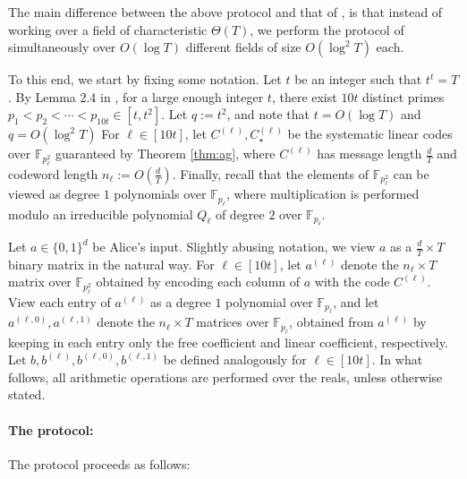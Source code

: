 \documentclass[11pt]{article}
\theoremstyle{plain}
\theoremstyle{remark}
\newcommand{\F}{\mathbb{F}}
\begin{document}
The main difference between the above protocol and that of \cite{CW19}, is that instead of working over a field of characteristic $\Theta(T)$, we perform the protocol of \cite{CW19} simultaneously over $O(\log T)$ different fields of size $O(\log^2T)$ each.

To this end, we start by fixing some notation.
Let $t$ be an integer such that $t^t=T$. By Lemma 2.4 in \cite{Che18}, for a large enough integer $t$, there exist $10 t$ distinct primes $p_{1} < p_2<\cdots < p_{10 t} \in [t,t^2]$.
Let $q:=t^2$, and note that $t = O(\log T)$ and $q = O(\log^2T)$
 For $\ell \in [10 t]$, let  $C^{(\ell)}, C_\star^{(\ell)}$  be the systematic linear codes over $\F_{p_\ell^2}$ guaranteed by Theorem \ref{thm:ag}, where $C^{(\ell)}$ has message length $\frac d T$ and codeword length $n_\ell:=O(\frac d T)$. 
 Finally, recall that the elements of $\F_{p_\ell^2}$ can be viewed as degree $1$ polynomials over $\F_{p_\ell}$, where multiplication is performed modulo an irreducible polynomial $Q_\ell$ of degree $2$ over $\F_{p_\ell}$. 
 
 Let $a \in\{0,1\}^{d}$ be Alice's input. Slightly abusing notation, we view $a$ as a $\frac d T \times T$ binary matrix in the natural way.
 For $\ell \in [10 t]$, let $a^{(\ell)}$ denote the  $ n_\ell \times T$ matrix over $\F_{p_\ell^2}$ obtained 
by encoding each column of 
$a$ with the code $C^{(\ell)}$. 
View each entry of $a^{(\ell)}$ as a degree $1$ polynomial over $\F_{p_\ell}$, and let $a^{(\ell,0)}, a^{(\ell,1)}$ denote the 
$n_\ell \times T$ matrices over $\F_{p_\ell}$, obtained from $a^{(\ell)}$ by keeping in each entry only the free coefficient and linear coefficient, respectively.
Let $b,b^{(\ell)}, b^{(\ell,0)}, b^{(\ell,1)}$ be defined analogously for $\ell \in [10 t]$. 
In what follows, all arithmetic operations are performed over the reals, unless otherwise stated.

 
\paragraph{The protocol:}

The protocol proceeds as follows:
\end{document}
